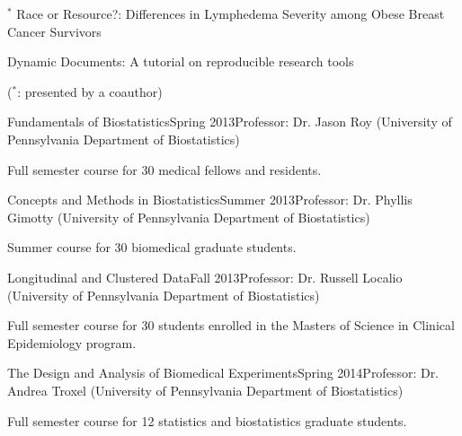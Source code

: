 \documentclass{gradstudentresume}
\begin{document}

\begin{pres}{$^{*}$ Race or Resource?: Differences in Lymphedema Severity among Obese Breast Cancer Survivors}
\item{}
\end{pres}

\begin{pres}{Dynamic Documents: A tutorial on reproducible research tools}
\item{}
\end{pres}
\vspace{2mm} 

($^{*}$: presented by a coauthor)
\largespace

\begin{desc}{Fundamentals of Biostatistics}{Spring 2013}{Professor: Dr. Jason Roy (University of Pennsylvania Department of Biostatistics)}
\item{Full semester course for 30 medical fellows and residents.}
\end{desc}


\begin{desc}{Concepts and Methods in Biostatistics}{Summer 2013}{Professor: Dr. Phyllis Gimotty (University of Pennsylvania Department of Biostatistics)}
\item{Summer course for 30 biomedical graduate students.}
\end{desc}

\begin{desc}{Longitudinal and Clustered Data}{Fall 2013}{Professor: Dr. Russell Localio (University of Pennsylvania Department of Biostatistics)}
\item{Full semester course for 30 students enrolled in the Masters of Science in Clinical Epidemiology program.}
\end{desc}

\begin{desc}{The Design and Analysis of Biomedical Experiments}{Spring 2014}{Professor: Dr. Andrea Troxel (University of Pennsylvania Department of Biostatistics)}
\item{Full semester course for 12 statistics and biostatistics graduate students.}
\end{desc}
\end{document}
